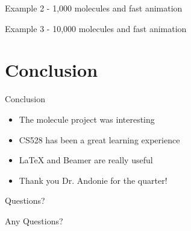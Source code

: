 \documentclass{if-beamer}
\begin{document}
\begin{frame}{Example 2 - 1,000 molecules and fast animation}
	\begin{center}
	\end{center}
\end{frame}

\begin{frame}{Example 3 - 10,000 molecules and fast animation}
	\begin{center}
	\end{center}
\end{frame}

\section{Conclusion}

\begin{frame}{Conclusion}
	\begin{itemize}
		\item The molecule project was interesting
		\item CS528 has been a great learning experience
		\item LaTeX and Beamer are really useful
		\item Thank you Dr. Andonie for the quarter!
	\end{itemize}
\end{frame}

\begin{frame}{Questions?}
	\begin{center}
		\alert{Any Questions?}
	\end{center}
\end{frame}
\end{document}
